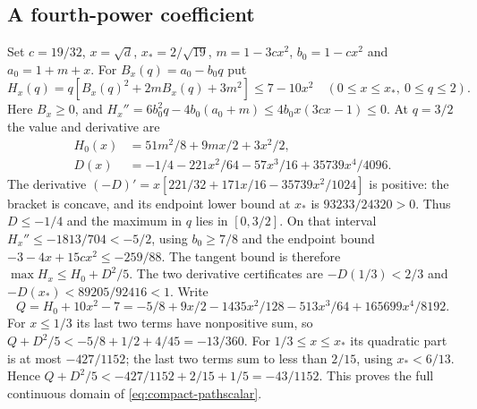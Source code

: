 \subsection{A fourth-power coefficient}\label{calc:pathscalar}
Set $c=19/32$, $x=\sqrt d$, $x_*=2/\sqrt{19}$,
$m=1-3cx^2$, $b_0=1-cx^2$ and $a_0=1+m+x$.
For $B_x(q)=a_0-b_0q$ put
\begin{equation}\label{eq:compact-pathscalar}
 H_x(q)=q[B_x(q)^2+2mB_x(q)+3m^2]\le7-10x^2
 \quad(0\le x\le x_*,\ 0\le q\le2).
\end{equation}
Here $B_x\ge0$, and
$H_x''=6b_0^2q-4b_0(a_0+m)\le4b_0x(3cx-1)\le0$.
At $q=3/2$ the value and derivative are
\begin{align*}
 H_0(x)&=51m^2/8+9mx/2+3x^2/2,\\
 D(x)&=-1/4-221x^2/64-57x^3/16+35739x^4/4096.
\end{align*}
The derivative $(-D)'=x[221/32+171x/16-35739x^2/1024]$ is positive:
the bracket is concave, and its endpoint lower bound at $x_*$ is
$93233/24320>0$. Thus $D\le-1/4$ and the maximum in $q$ lies in
$[0,3/2]$. On that interval $H_x''\le-1813/704<-5/2$, using
$b_0\ge7/8$ and the endpoint bound
$-3-4x+15cx^2\le-259/88$.
The tangent bound is therefore $\max H_x\le H_0+D^2/5$.
The two derivative certificates are $-D(1/3)<2/3$ and
$-D(x_*)<89205/92416<1$.
Write
\[
 Q=H_0+10x^2-7
 =-5/8+9x/2-1435x^2/128-513x^3/64+165699x^4/8192.
\]
For $x\le1/3$ its last two terms have nonpositive sum, so
$Q+D^2/5<-5/8+1/2+4/45=-13/360$.
For $1/3\le x\le x_*$ its quadratic part is at most $-427/1152$;
the last two terms sum to less than $2/15$, using $x_*<6/13$.
Hence $Q+D^2/5<-427/1152+2/15+1/5=-43/1152$.
This proves the full continuous domain of \eqref{eq:compact-pathscalar}.

